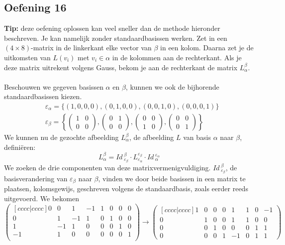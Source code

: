 \documentclass[lineaire_algebra_oplossingen.tex]{subfiles}
\begin{document}
\subsection{Oefening 16}
\textbf{Tip:} deze oefening oplossen kan veel sneller dan de methode hieronder beschreven. Je kan namelijk zonder standaardbasissen werken. Zet in een $(4 \times 8)$-matrix in de linkerkant elke vector van $\beta$ in een kolom. Daarna zet je de uitkomsten van $L(v_i)$ met $v_i \in \alpha$ in de kolommen aan de rechterkant. Als je deze matrix uitrekent volgens Gauss, bekom je aan de rechterkant de matrix $L^\beta_\alpha$.\\\\
Beschouwen we gegeven basissen $\alpha$ en $\beta$, kunnen we ook de bijhorende standaardbasissen kiezen.
\begin{align*}
& \varepsilon_\alpha = \{(1,0,0,0),(0,1,0,0),(0,0,1,0),(0,0,0,1)\} \\
& \varepsilon_\beta
= \left\{
     \begin{pmatrix} 1&0\\ 0&0 \end{pmatrix}
   , \begin{pmatrix} 0&1\\ 0&0 \end{pmatrix}
   , \begin{pmatrix} 0&0\\ 1&0 \end{pmatrix}
   , \begin{pmatrix} 0&0\\ 0&1 \end{pmatrix}
  \right\}
\end{align*}
We kunnen nu de gezochte afbeelding $L^\beta_\alpha$, de afbeelding $L$ van basis $\alpha$ naar $\beta$, defini\"eren:
\[
L^\beta_\alpha = \textit{Id}\,^\beta_{\varepsilon_\beta}\cdot L^{\varepsilon_\beta}_{\varepsilon_\alpha}\cdot \textit{Id}\,^{\varepsilon_\alpha}_{\alpha}
\]
We zoeken de drie componenten van deze matrixvermenigvuldiging. $\textit{Id}\,^\beta_{\varepsilon_\beta}$, de basisverandering van $\varepsilon_\beta$ naar $\beta$, vinden we door beide basissen in een matrix te plaatsen, kolomsgewijs, geschreven volgens de standaardbasis, zoals eerder reeds uitgevoerd. We bekomen
\[
\begin{pmatrix}[cccc|cccc]
0 & 0 & 1 & -1 & 1 & 0 & 0 & 0 \\ 
0 & 1 & -1 & 1 & 0 & 1 & 0 & 0 \\ 
1 & -1 & 1 & 0 & 0 & 0 & 1 & 0 \\ 
-1 & 1 & 0 & 0 & 0 & 0 & 0 & 1 \\ 
\end{pmatrix}
\longrightarrow
\begin{pmatrix}[cccc|cccc]
1 & 0 & 0 & 0 &  1 & 1 & 0 & -1 \\
0 & 1 & 0 & 0 &  1 & 1 & 0 &  0 \\
0 & 0 & 1 & 0 &  0 & 0 & 1 &  1 \\
0 & 0 & 0 & 1 & -1 & 0 & 1 &  1
\end{pmatrix}
\]
\end{document}
